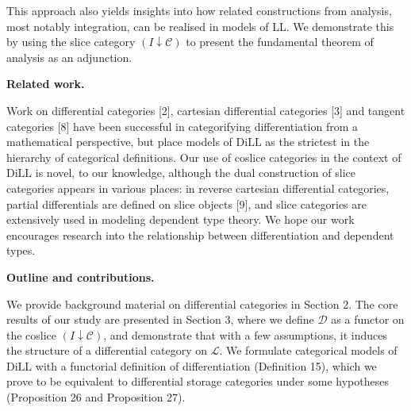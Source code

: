 This approach also yields insights into how related constructions from analysis, most notably integration, can be realised in models of LL. We demonstrate this by using the slice category $(I\downarrow\mathscr{C})$ to present the fundamental theorem of analysis as an adjunction.\par
 
 
 
\par\medskip\noindent\textbf{Related work.}\par
 
 
Work on differential categories [2], cartesian differential categories [3] and tangent categories [8] have been successful in categorifying differentiation from a mathematical perspective, but place models of $\mathrm{DiLL}$ as the strictest in the hierarchy of categorical definitions. Our use of coslice categories in the context of $\mathrm{DiLL}$ is novel, to our knowledge, although the dual construction of slice categories appears in various places: in reverse cartesian differential categories, partial differentials are defined on slice objects [9], and slice categories are extensively used in modeling dependent type theory. We hope our work encourages research into the relationship between differentiation and dependent types.\par
 
 
 
 
\par\medskip\noindent\textbf{Outline and contributions.}\par
 
 
We provide background material on differential categories in Section 2. The core results of our study are presented in Section 3, where we define $\mathcal{D}$ as a functor on the coslice $(I\downarrow\mathscr{C})$, and demonstrate that with a few assumptions, it induces the structure of a differential category on $\mathscr{L}$. We formulate categorical models of $\mathrm{DiLL}$ with a functorial definition of differentiation (Definition 15), which we prove to be equivalent to differential storage categories under some hypotheses (Proposition 26 and Proposition 27).\par
 
